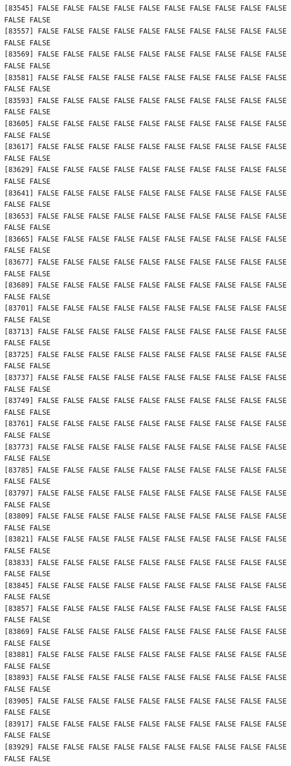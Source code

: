 \documentclass[
  a4paper,
  DIV=11,
  numbers=noendperiod]{scrartcl}
\begin{document}
\begin{verbatim}
[83545] FALSE FALSE FALSE FALSE FALSE FALSE FALSE FALSE FALSE FALSE FALSE FALSE
[83557] FALSE FALSE FALSE FALSE FALSE FALSE FALSE FALSE FALSE FALSE FALSE FALSE
[83569] FALSE FALSE FALSE FALSE FALSE FALSE FALSE FALSE FALSE FALSE FALSE FALSE
[83581] FALSE FALSE FALSE FALSE FALSE FALSE FALSE FALSE FALSE FALSE FALSE FALSE
[83593] FALSE FALSE FALSE FALSE FALSE FALSE FALSE FALSE FALSE FALSE FALSE FALSE
[83605] FALSE FALSE FALSE FALSE FALSE FALSE FALSE FALSE FALSE FALSE FALSE FALSE
[83617] FALSE FALSE FALSE FALSE FALSE FALSE FALSE FALSE FALSE FALSE FALSE FALSE
[83629] FALSE FALSE FALSE FALSE FALSE FALSE FALSE FALSE FALSE FALSE FALSE FALSE
[83641] FALSE FALSE FALSE FALSE FALSE FALSE FALSE FALSE FALSE FALSE FALSE FALSE
[83653] FALSE FALSE FALSE FALSE FALSE FALSE FALSE FALSE FALSE FALSE FALSE FALSE
[83665] FALSE FALSE FALSE FALSE FALSE FALSE FALSE FALSE FALSE FALSE FALSE FALSE
[83677] FALSE FALSE FALSE FALSE FALSE FALSE FALSE FALSE FALSE FALSE FALSE FALSE
[83689] FALSE FALSE FALSE FALSE FALSE FALSE FALSE FALSE FALSE FALSE FALSE FALSE
[83701] FALSE FALSE FALSE FALSE FALSE FALSE FALSE FALSE FALSE FALSE FALSE FALSE
[83713] FALSE FALSE FALSE FALSE FALSE FALSE FALSE FALSE FALSE FALSE FALSE FALSE
[83725] FALSE FALSE FALSE FALSE FALSE FALSE FALSE FALSE FALSE FALSE FALSE FALSE
[83737] FALSE FALSE FALSE FALSE FALSE FALSE FALSE FALSE FALSE FALSE FALSE FALSE
[83749] FALSE FALSE FALSE FALSE FALSE FALSE FALSE FALSE FALSE FALSE FALSE FALSE
[83761] FALSE FALSE FALSE FALSE FALSE FALSE FALSE FALSE FALSE FALSE FALSE FALSE
[83773] FALSE FALSE FALSE FALSE FALSE FALSE FALSE FALSE FALSE FALSE FALSE FALSE
[83785] FALSE FALSE FALSE FALSE FALSE FALSE FALSE FALSE FALSE FALSE FALSE FALSE
[83797] FALSE FALSE FALSE FALSE FALSE FALSE FALSE FALSE FALSE FALSE FALSE FALSE
[83809] FALSE FALSE FALSE FALSE FALSE FALSE FALSE FALSE FALSE FALSE FALSE FALSE
[83821] FALSE FALSE FALSE FALSE FALSE FALSE FALSE FALSE FALSE FALSE FALSE FALSE
[83833] FALSE FALSE FALSE FALSE FALSE FALSE FALSE FALSE FALSE FALSE FALSE FALSE
[83845] FALSE FALSE FALSE FALSE FALSE FALSE FALSE FALSE FALSE FALSE FALSE FALSE
[83857] FALSE FALSE FALSE FALSE FALSE FALSE FALSE FALSE FALSE FALSE FALSE FALSE
[83869] FALSE FALSE FALSE FALSE FALSE FALSE FALSE FALSE FALSE FALSE FALSE FALSE
[83881] FALSE FALSE FALSE FALSE FALSE FALSE FALSE FALSE FALSE FALSE FALSE FALSE
[83893] FALSE FALSE FALSE FALSE FALSE FALSE FALSE FALSE FALSE FALSE FALSE FALSE
[83905] FALSE FALSE FALSE FALSE FALSE FALSE FALSE FALSE FALSE FALSE FALSE FALSE
[83917] FALSE FALSE FALSE FALSE FALSE FALSE FALSE FALSE FALSE FALSE FALSE FALSE
[83929] FALSE FALSE FALSE FALSE FALSE FALSE FALSE FALSE FALSE FALSE FALSE FALSE

\end{verbatim}
\end{document}
